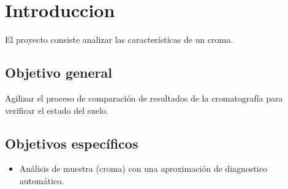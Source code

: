 \newpage
\section{Introduccion}
El proyecto consiste analizar las características de un croma.

\subsection{Objetivo general}
Agilizar el proceso de comparación de resultados de la cromatografía para verificar el estado del suelo. 

\subsection{Objetivos específicos}
\begin{itemize}
\item Análisis de muestra (croma) con una aproximación de diagnostico automático.
\end{itemize}
